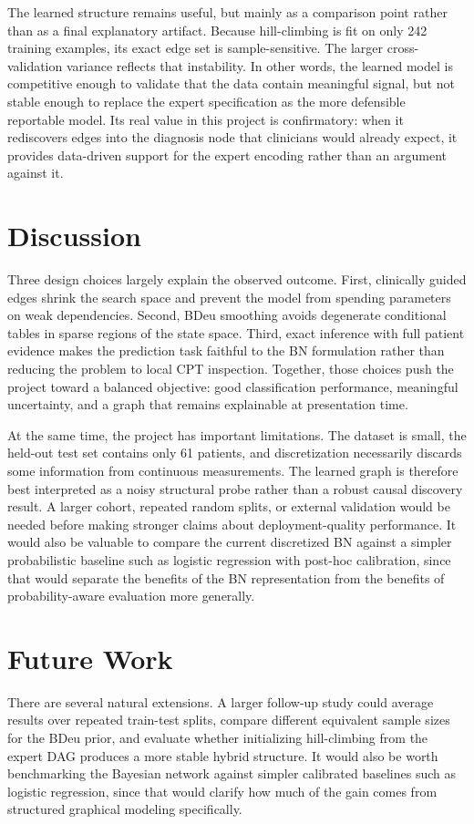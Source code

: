 \documentclass[10pt,twocolumn]{article}
\begin{document}
The learned structure remains useful, but mainly as a comparison point rather than as a final explanatory artifact. Because hill-climbing is fit on only 242 training examples, its exact edge set is sample-sensitive. The larger cross-validation variance reflects that instability. In other words, the learned model is competitive enough to validate that the data contain meaningful signal, but not stable enough to replace the expert specification as the more defensible reportable model. Its real value in this project is confirmatory: when it rediscovers edges into the diagnosis node that clinicians would already expect, it provides data-driven support for the expert encoding rather than an argument against it.

\section{Discussion}
Three design choices largely explain the observed outcome. First, clinically guided edges shrink the search space and prevent the model from spending parameters on weak dependencies. Second, BDeu smoothing avoids degenerate conditional tables in sparse regions of the state space. Third, exact inference with full patient evidence makes the prediction task faithful to the BN formulation rather than reducing the problem to local CPT inspection. Together, those choices push the project toward a balanced objective: good classification performance, meaningful uncertainty, and a graph that remains explainable at presentation time.

At the same time, the project has important limitations. The dataset is small, the held-out test set contains only 61 patients, and discretization necessarily discards some information from continuous measurements. The learned graph is therefore best interpreted as a noisy structural probe rather than a robust causal discovery result. A larger cohort, repeated random splits, or external validation would be needed before making stronger claims about deployment-quality performance. It would also be valuable to compare the current discretized BN against a simpler probabilistic baseline such as logistic regression with post-hoc calibration, since that would separate the benefits of the BN representation from the benefits of probability-aware evaluation more generally.

\section{Future Work}
There are several natural extensions. A larger follow-up study could average results over repeated train-test splits, compare different equivalent sample sizes for the BDeu prior, and evaluate whether initializing hill-climbing from the expert DAG produces a more stable hybrid structure. It would also be worth benchmarking the Bayesian network against simpler calibrated baselines such as logistic regression, since that would clarify how much of the gain comes from structured graphical modeling specifically.
\end{document}
